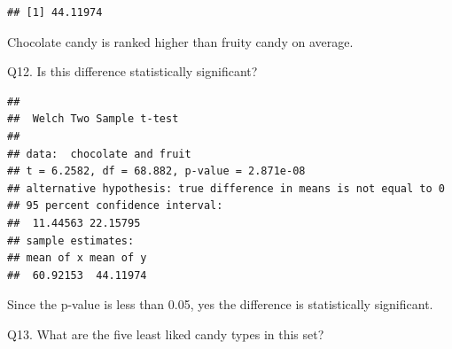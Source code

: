 \documentclass[
]{article}
\newenvironment{Shaded}{\begin{snugshade}}{\end{snugshade}}
\newcommand{\AttributeTok}[1]{\textcolor[rgb]{0.13,0.29,0.53}{#1}}
\newcommand{\DecValTok}[1]{\textcolor[rgb]{0.00,0.00,0.81}{#1}}
\newcommand{\FunctionTok}[1]{\textcolor[rgb]{0.13,0.29,0.53}{\textbf{#1}}}
\newcommand{\NormalTok}[1]{#1}
\newcommand{\OtherTok}[1]{\textcolor[rgb]{0.56,0.35,0.01}{#1}}
\newcommand{\SpecialCharTok}[1]{\textcolor[rgb]{0.81,0.36,0.00}{\textbf{#1}}}
\begin{document}
\begin{Shaded}
\end{Shaded}

\begin{verbatim}
## [1] 44.11974
\end{verbatim}

Chocolate candy is ranked higher than fruity candy on average.

Q12. Is this difference statistically significant?

\begin{Shaded}
\end{Shaded}

\begin{verbatim}
## 
##  Welch Two Sample t-test
## 
## data:  chocolate and fruit
## t = 6.2582, df = 68.882, p-value = 2.871e-08
## alternative hypothesis: true difference in means is not equal to 0
## 95 percent confidence interval:
##  11.44563 22.15795
## sample estimates:
## mean of x mean of y 
##  60.92153  44.11974
\end{verbatim}

Since the p-value is less than 0.05, yes the difference is statistically
significant.

Q13. What are the five least liked candy types in this set?

\begin{Shaded}
\end{Shaded}
\end{document}
